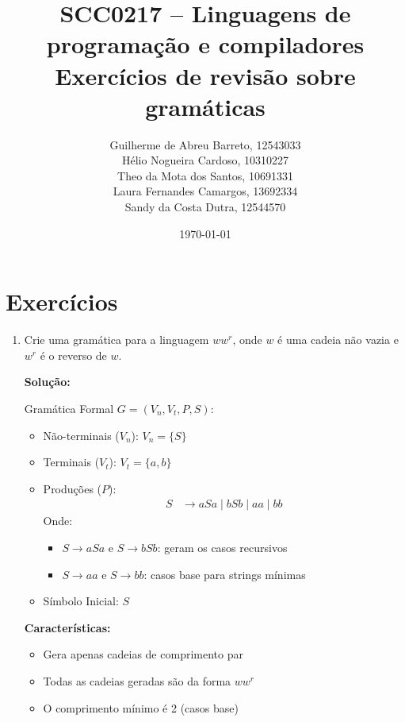 \documentclass[12pt]{article}
\title{SCC0217 – Linguagens de programação e compiladores \\ Exercícios de revisão sobre gramáticas}
\author{Guilherme de Abreu Barreto, 12543033 \\
Hélio Nogueira Cardoso, 10310227 \\
Theo da Mota dos Santos, 10691331 \\
Laura Fernandes Camargos, 13692334 \\
Sandy da Costa Dutra, 12544570}
\date{\today}
\begin{document}
\maketitle

\section*{Exercícios}

\begin{enumerate}
	\item Crie uma gramática para a linguagem $ww^r$, onde $w$ é uma cadeia não vazia e $w^r$ é o reverso de $w$.
	      
	      \textbf{Solução:}
	      
	      Gramática Formal $G=(V_n,V_t,P,S)$:
	      
	      \begin{itemize}
		      \item Não-terminais ($V_n$): $V_n = \{S\}$
		            
		      \item Terminais ($V_t$): $V_t = \{a, b\}$
		            
		      \item Produções ($P$):
		            \begin{align*}
			            S & \rightarrow aSa \mid bSb \mid aa \mid bb
		            \end{align*}
		            Onde:
		            \begin{itemize}
			            \item $S \rightarrow aSa$ e $S \rightarrow bSb$: geram os casos recursivos
			            \item $S \rightarrow aa$ e $S \rightarrow bb$: casos base para strings mínimas
		            \end{itemize}
		            
		      \item Símbolo Inicial: $S$
	      \end{itemize}
	      
	      \textbf{Características:}
	      \begin{itemize}
		      \item Gera apenas cadeias de comprimento par
		      \item Todas as cadeias geradas são da forma $ww^r$
		      \item O comprimento mínimo é 2 (casos base)
	      \end{itemize}
	      

\end{enumerate}
\end{document}
